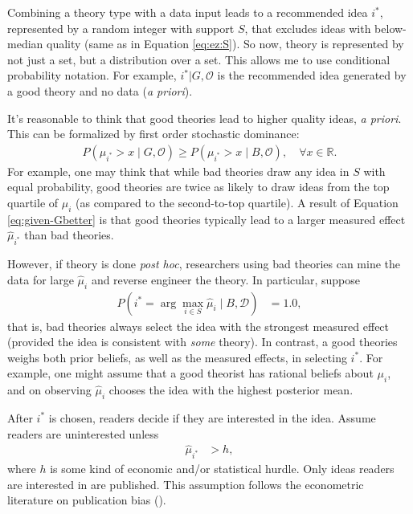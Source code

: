 \documentclass[12pt,english]{article}
\theoremstyle{plain}
\theoremstyle{plain}
\begin{document}
Combining a theory type with a data input leads to a recommended idea $i^{\ast}$, represented by a random integer with support $S$, that excludes ideas with below-median quality (same as in Equation \eqref{eq:ez:S}). So now, theory is represented by not just a set, but a distribution over a set. This allows me to use conditional probability notation. For example, $i^{\ast}|G,\mathcal{O}$ is the recommended idea generated by a good theory and no data (\emph{a priori}).

It's reasonable to think that good theories lead to higher quality ideas, \emph{a priori}. This can be formalized by first order stochastic dominance:
\begin{align}
P\left(\mu_{i^{\ast}}>x\mid G,\mathcal{O}\right)
\geq
P\left(\mu_{i^{\ast}}>x\mid B,\mathcal{O}\right),
\quad \forall x\in \mathbb{R}.
\label{eq:given-Gbetter}
\end{align}
For example, one may think that while bad theories draw any idea in $S$ with equal probability, good theories are twice as likely to draw ideas from the top quartile of $\mu_{i}$ (as compared to the second-to-top quartile). A result of Equation \eqref{eq:given-Gbetter} is that  good theories typically lead to a larger measured effect $\hat{\mu}_{i^{\ast}}$
than bad theories.

However, if theory is done \emph{post hoc}, researchers using bad theories can mine the data for large $\hat{\mu}_{i}$ and reverse engineer the theory. In particular, suppose 
\begin{align}
P\left(i^{\ast}=\arg\max_{i\in S }\hat{\mu}_{i}\mid B,\mathcal{D}\right) & =1.0,
\label{eq:endo:bad-post-hoc}
\end{align}
that is, bad theories always select the idea with the strongest measured effect (provided the idea is consistent with \emph{some} theory).  In contrast, a good theories weighs both prior beliefs, as well as the measured effects, in selecting $i^{\ast}$.  For example, one might assume that a good theorist has rational beliefs about $\mu_{i}$, and on observing $\hat{\mu}_{i}$ chooses the idea with the highest posterior mean. 


After $i^{\ast}$ is chosen, readers decide if they are interested in the idea. Assume readers are uninterested unless 
\begin{align}
\hat{\mu}_{i^{\ast}} & >h,
\end{align}
where $h$ is some kind of economic and/or statistical hurdle. Only ideas readers are interested in are published. This assumption follows the econometric literature on publication bias (\citet{andrews2019identification}).
\end{document}
